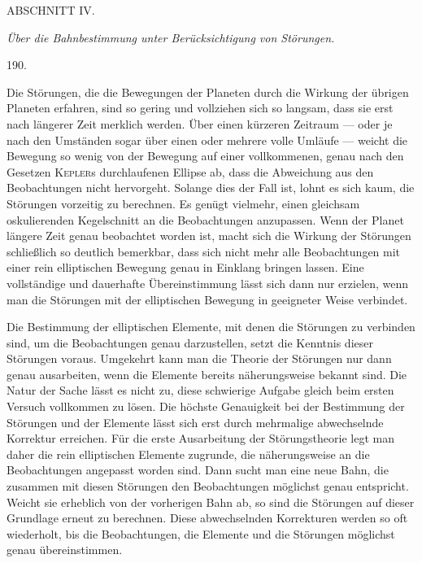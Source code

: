 \clearpage
{}
\begin{center}
{\large ABSCHNITT IV.}\par\medskip
{}
\textit{Über die Bahnbestimmung unter Berücksichtigung von Störungen.}
\end{center}
\begin{center}\hypertarget{native-264-article190}{}190.\end{center}
Die Störungen, die die Bewegungen der Planeten durch die Wirkung der
übrigen Planeten erfahren, sind so gering und vollziehen sich so langsam,
dass sie erst nach längerer Zeit merklich werden. Über einen kürzeren
Zeitraum --- oder je nach den Umständen sogar über einen oder mehrere
volle Umläufe --- weicht die Bewegung so wenig von der Bewegung auf
einer vollkommenen, genau nach den Gesetzen \textsc{Kepler}s durchlaufenen
Ellipse ab, dass die Abweichung aus den Beobachtungen nicht hervorgeht.
Solange dies der Fall ist, lohnt es sich kaum, die Störungen vorzeitig
zu berechnen. Es genügt vielmehr, einen gleichsam oskulierenden Kegelschnitt
an die Beobachtungen anzupassen. Wenn der Planet längere Zeit genau
beobachtet worden ist, macht sich die Wirkung der Störungen schließlich
so deutlich bemerkbar, dass sich nicht mehr alle Beobachtungen mit einer
rein elliptischen Bewegung genau in Einklang bringen lassen. Eine
vollständige und dauerhafte Übereinstimmung lässt sich dann nur erzielen,
wenn man die Störungen mit der elliptischen Bewegung in geeigneter Weise
verbindet.

Die Bestimmung der elliptischen Elemente, mit denen die Störungen zu
verbinden sind, um die Beobachtungen genau darzustellen, setzt die
Kenntnis dieser Störungen voraus. Umgekehrt kann man die Theorie der
Störungen nur dann genau ausarbeiten, wenn die Elemente bereits
näherungsweise bekannt sind. Die Natur der Sache lässt es nicht zu, diese
schwierige Aufgabe gleich beim ersten Versuch vollkommen zu lösen. Die
höchste Genauigkeit bei der Bestimmung der Störungen und der Elemente
lässt sich erst durch mehrmalige abwechselnde Korrektur erreichen. Für
die erste Ausarbeitung der Störungstheorie legt man daher die rein
elliptischen Elemente zugrunde, die näherungsweise an die
Beobachtungen angepasst worden sind.
Dann sucht man eine neue Bahn, die zusammen mit diesen Störungen den
Beobachtungen möglichst genau entspricht. Weicht sie erheblich von der
vorherigen Bahn ab, so sind die Störungen auf dieser Grundlage erneut
zu berechnen. Diese abwechselnden Korrekturen werden so oft wiederholt,
bis die Beobachtungen, die Elemente und die Störungen möglichst genau
übereinstimmen.
